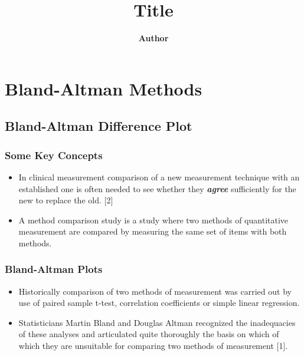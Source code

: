 \documentclass[compress]{beamer}        %
\title
{
{\huge Title\\[0.3cm] }
}
\author[Kevin O'Brien]{{\bf Author}}
\institute[University of Limerick, Maths \& Stats Dept]{}
\date{}
\begin{document}
\section{Bland-Altman Methods}
















\subsection{Bland-Altman Difference Plot}
\begin{frame}
\frametitle{Some Key Concepts}
\begin{itemize}
\item In clinical measurement comparison of a new measurement technique with an established one is often needed to see whether they \textbf{\textit{agree}} sufficiently for the new to replace the old. [2]
\item 
A method comparison study is
a study where two methods of quantitative measurement are compared by measuring the
same set of items with both methods.

\end{itemize}
\end{frame}
\begin{frame}
\frametitle{Bland-Altman Plots}
\large
\begin{itemize}
\item Historically comparison of two methods of measurement was carried
out by use of paired sample t-test, correlation coefficients or
simple linear regression.
\item  Statisticians Martin Bland and Douglas
Altman recognized the inadequacies of these analyses and
articulated quite thoroughly the basis on which of which they are
unsuitable for comparing two methods of measurement [1].

\end{itemize}
\end{frame}
\end{document}
